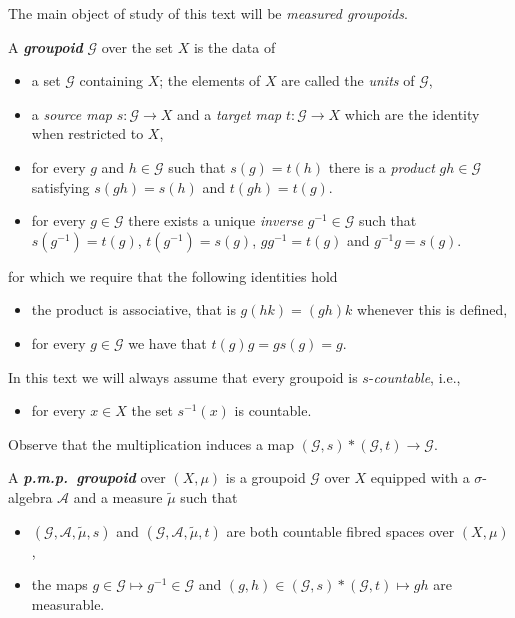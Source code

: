 \documentclass[AHL,Unicode,longabstracts,published]{cedram}
\newcommand{\defin}[1]{\textbf{\emph{#1}}}
\newcommand{\cg}{\mathcal{G}}
\newcommand{\ra}{\mathscr{A}}
\newcommand{\pmp}{p.m.p.\ }
\begin{document}
The main object of study of this text will be \emph{measured groupoids}.
\begin{defi}
A \defin{groupoid} $\cg$ over the set $X$ is the data of
\begin{itemize}
\item a set $\cg$ containing $X$; the elements of $X$ are called the \emph{units} of $\cg$,
\item a \emph{source map} $s:\cg\rightarrow X$ and a \emph{target map} $t:\cg\rightarrow X$ which are the identity when restricted to $X$,
\item for every $g$ and $h\in\cg$ such that $s(g)=t(h)$ there is a \emph{product} $gh\in\cg$ satisfying $s(gh) = s(h)$ and $t(gh) =t(g)$.
\item for every $g\in\cg$ there exists a unique \emph{inverse} $g^{-1}\in\cg$ such that $s(g^{-1}) = t(g)$, $t(g^{-1})=s(g)$, $g g^{-1} = t(g)$ and $g^{-1}g=s(g)$.
\end{itemize}
for which we require that the following identities hold
\begin{itemize}
\item the product is associative, that is $g(hk)=(gh)k$ whenever this is defined,
\item for every $g\in \cg$ we have that $t(g)g=g s(g) = g$.
\end{itemize}
\end{defi}

In this text we will always assume that every groupoid is $s$-\emph{countable}, i.e.,
\begin{itemize}
\item for every $x\in X$ the set $s^{-1}(x)$ is countable.
\end{itemize}
Observe that the multiplication induces a map $(\cg,s)*(\cg,t)\rightarrow \cg$.

\begin{defi}\label{def: pmp groupoid}
A
\defin{\pmp groupoid} over $(X,\mu)$ is a groupoid $\cg$ over $X$ equipped with a $\sigma$-algebra $\ra$ and a measure $\widetilde \mu$ such that
\begin{itemize}
\item $(\cg,\ra,\widetilde \mu,s)$ and $(\cg,\ra,\widetilde \mu,t)$ are both countable fibred spaces over $(X,\mu)$,
\item the maps $g \in \cg \mapsto g^{-1} \in \cg$ and $(g,h) \in (\cg,s) \ast (\cg,t) \mapsto gh$ are measurable.
\end{itemize}
\end{defi}
\end{document}
